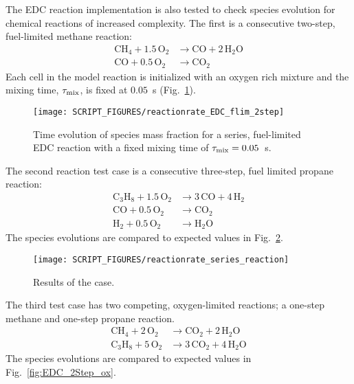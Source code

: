 \documentclass[11pt]{book}
\begin{document}
The EDC reaction implementation is also tested to check species evolution for chemical reactions of increased complexity. The first is a consecutive two-step, fuel-limited methane reaction:
\begin{align}\label{eq:2step_methane}
\mathrm{CH_4 + 1.5 \, O_2} &\rightarrow  \mathrm{CO + 2 \, H_2O} \\
\nonumber \mathrm{CO + 0.5 \, O_2} &\rightarrow \mathrm{CO_2}
\end{align}
Each cell in the model reaction is initialized with an oxygen rich mixture and the mixing time, $\tau_{\rm mix}$, is fixed at $0.05$~s (Fig.~\ref{fig:EDC_2Step_fuel}).

\begin{figure}[!ht]
\centering
\texttt{[image: SCRIPT\_FIGURES/reactionrate\_EDC\_flim\_2step]}
\caption[Species evolution in 2-step methane EDC reaction]{Time evolution of species mass fraction for a series, fuel-limited EDC reaction with a fixed mixing time of $\tau_{\rm mix}=0.05$~s.}
\label{fig:EDC_2Step_fuel}
\end{figure}

The second reaction test case is a consecutive three-step, fuel limited propane reaction:
\begin{align}\label{eq:3step_propane}
\mathrm{C_3H_8 + 1.5 \, O_2} &\rightarrow  \mathrm{3 \,CO + 4 \, H_2} \\
\nonumber \mathrm{CO + 0.5 \, O_2} &\rightarrow \mathrm{CO_2} \\
\nonumber \mathrm{H_2 + 0.5 \, O_2} &\rightarrow \mathrm{H_2O}
\end{align}
The species evolutions are compared to expected values in Fig.~\ref{fig:reactionrate_series_reaction}.

\begin{figure}[!ht]
\centering
\texttt{[image: SCRIPT\_FIGURES/reactionrate\_series\_reaction]}
\caption[Results of the  case]{Results of the  case.}
\label{fig:reactionrate_series_reaction}
\end{figure}

The third test case has two competing, oxygen-limited reactions; a one-step methane and one-step propane reaction.
\begin{align}\label{eq:2step_o2_lim}
\mathrm{CH_4 + 2 \, O_2} &\rightarrow  \mathrm{CO_2 + 2 \, H_2O} \\
\nonumber \mathrm{C_3H_8 + 5 \, O_2} &\rightarrow \mathrm{3 \,CO_2 + 4 \, H_2O}
\end{align}
The species evolutions are compared to expected values in Fig.~\ref{fig:EDC_2Step_ox}.
\end{document}
